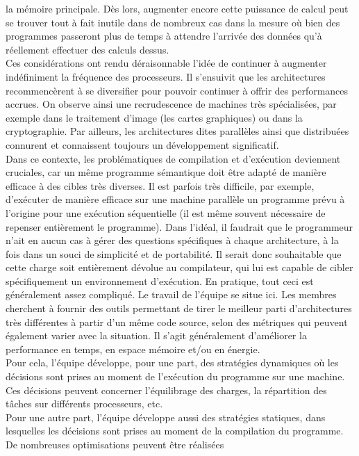 \documentclass{report}
\begin{document}
la mémoire principale. Dès lors, augmenter encore cette puissance de calcul peut se trouver tout à 
fait inutile dans de nombreux cas dans la mesure où bien des programmes passeront plus de temps à 
attendre l'arrivée des données qu'à réellement effectuer des calculs dessus. 
\\ Ces considérations ont rendu déraisonnable l'idée de continuer à augmenter indéfiniment la fréquence des 
processeurs. Il s'ensuivit que les architectures recommencèrent à se diversifier pour pouvoir continuer à 
offrir des performances accrues. On observe ainsi une recrudescence de machines très spécialisées, par 
exemple dans le traitement d'image (les cartes graphiques) ou dans la cryptographie. Par ailleurs, les 
architectures dites parallèles ainsi que distribuées connurent et connaissent toujours un développement 
significatif.
\\ Dans ce contexte, les problématiques de compilation et d'exécution deviennent cruciales, car un même 
programme sémantique doit être adapté de manière efficace à des cibles très diverses. Il est parfois 
très difficile, par exemple, d'exécuter de manière efficace sur une machine parallèle un programme
prévu à l'origine pour une exécution séquentielle (il est même souvent nécessaire de repenser 
entièrement le programme). Dans l'idéal, il faudrait que le programmeur n'ait en aucun cas à gérer des 
questions spécifiques à chaque architecture, à la fois dans un souci de simplicité et de portabilité.
Il serait donc souhaitable que cette charge soit entièrement dévolue au compilateur, qui lui est 
capable de cibler spécifiquement un environnement d'exécution. En pratique, tout ceci est généralement 
assez compliqué. Le travail de l'équipe se situe ici. Les membres cherchent à fournir des outils
permettant de tirer le meilleur parti d'architectures très différentes à partir d'un même code source, 
selon des métriques qui peuvent également varier avec la situation. Il s'agit généralement d'améliorer 
la performance en temps, en espace mémoire et/ou en énergie.
\\ Pour cela, l'équipe développe, pour une part, des stratégies dynamiques où les décisions sont prises au
moment de l'exécution du programme sur une machine. Ces décisions peuvent concerner l'équilibrage
des charges, la répartition des tâches sur différents processeurs, etc.
\\Pour une autre part, l'équipe développe aussi des stratégies statiques, dans lesquelles les décisions
sont prises au moment de la compilation du programme. De nombreuses optimisations peuvent être réalisées
\end{document}
